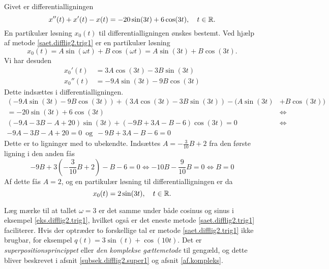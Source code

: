 \begin{example}[Trigonometrisk] \label{eks.difflig2.trig1}
Givet er differentialligningen
\begin{equation}
x''(t) + x'(t) - x(t) = -20\sin(3t) + 6\cos(3t), \quad t \in \mathbb{R}.
\end{equation}
En partikulær løsning $ x_0(t) $ til differentialligningen ønskes bestemt. Ved hjælp af metode \ref{saet.difflig2.trig1} er en partikulær løsning
\begin{equation}
x_0(t) = A\sin(\omega t) + B\cos(\omega t) = A\sin(3t) + B\cos(3t).
\end{equation}
Vi har desuden
\begin{equation}
\begin{aligned}
x_0'(t) &= 3A\cos(3t) - 3B\sin(3t) \\
x_0''(t) &= -9A\sin(3t) - 9B\cos(3t)
\end{aligned}
\end{equation}
Dette indsættes i differentialligningen.
\begin{equation}
\begin{aligned}
(-9A\sin(3t) - 9B\cos(3t)) + (3A\cos(3t) - 3B\sin(3t)) - (A\sin(3t) &+ B\cos(3t)) \\
= -20\sin(3t) + 6\cos(3t) &\Leftrightarrow \\
(-9A-3B-A+20)\sin(3t) + (-9B+3A-B-6)\cos(3t) = 0  &\Leftrightarrow \\
-9A-3B-A+20 = 0 \,\,\,\mathrm{og}\,\,\, -9B+3A-B-6 = 0 &
\end{aligned}
\end{equation}
Dette er to ligninger med to ubekendte. Indsættes $ A = -\frac{3}{10}B + 2 $ fra den første ligning i den anden fås
\begin{equation}
-9B+3\left(-\frac{3}{10}B + 2\right)-B-6 = 0 \Leftrightarrow -10B - \frac{9}{10}B = 0 \Leftrightarrow B = 0
\end{equation}
Af dette fås $ A = 2 $, og en partikulær løsning til differentialligningen er da
\begin{equation}
x_0(t) = 2\sin(3t), \quad t \in \mathbb{R}.
\end{equation}
\end{example}

\begin{obs}
Læg mærke til at tallet $ \omega = 3 $ er det samme under både cosinus og sinus i eksempel \ref{eks.difflig2.trig1}, hvilket også er det eneste metode \ref{saet.difflig2.trig1} faciliterer. Hvis der optræder to forskellige tal er metode \ref{saet.difflig2.trig1} ikke brugbar, for eksempel $ q(t) = 3\sin(t) + \cos(10t) $. Det er \textit{superpositionsprincippet} eller \textit{den komplekse gættemetode} til gengæld, og dette bliver beskrevet i afsnit \ref{subsek.difflig2.super1} og afsnit \ref{af.kompleks}.
\end{obs}

